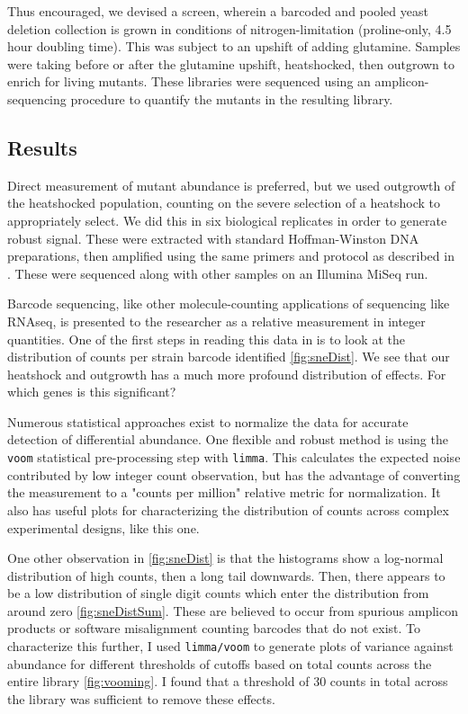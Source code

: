 Thus encouraged, we devised a screen, wherein a barcoded and pooled 
yeast deletion collection
is grown in conditions of nitrogen-limitation (proline-only, 4.5 hour
doubling time). This was subject to an upshift of adding glutamine.
Samples were taking before or after the glutamine upshift,
heatshocked, then outgrown to enrich for living mutants.
These libraries were sequenced using an amplicon-sequencing procedure
to quantify the mutants in the resulting library.

\subsection{Results}

Direct measurement of mutant abundance is preferred, but we used
outgrowth of the heatshocked population, counting on the severe
selection of a heatshock to appropriately select.
We did this in six biological replicates in order to generate robust
signal.
These were extracted with standard Hoffman-Winston DNA preparations,
then amplified using the same primers and protocol as described in
\parencite{robinson2013design}. These were sequenced along with other
samples on an Illumina MiSeq run.

Barcode sequencing, like other molecule-counting applications of
sequencing like RNAseq, is presented to the researcher as a relative 
measurement in integer quantities. 
One of the first steps in reading this data in is to look at the
distribution of counts per strain barcode identified
\autoref{fig:sneDist}.
We see that our heatshock and outgrowth has a much more profound
distribution of effects.
For which genes is this significant?


Numerous statistical approaches
exist to normalize the data for accurate detection of differential
abundance. One flexible and robust method is using the \texttt{voom}
statistical pre-processing step with \texttt{limma}. 
This calculates
the expected noise contributed by low integer count observation, but
has the advantage of converting the measurement to a "counts per
million" relative metric for normalization. 
It also has useful plots for characterizing the distribution of counts
across complex experimental designs, like this one.

One other observation in \autoref{fig:sneDist} is that the histograms
show a log-normal distribution of high counts, then a long tail
downwards. 
Then, there appears to be a low distribution of single digit counts
which enter the distribution from around zero \autoref{fig:sneDistSum}.
These are believed to occur from spurious amplicon products or
software misalignment counting barcodes that do not exist.
To characterize this further, I used \texttt{limma/voom} to generate
plots of variance against abundance for different thresholds of
cutoffs based on total counts across the entire library
\autoref{fig:vooming}.
I found that a threshold of 30 counts in total across the library
was sufficient to remove these effects.

